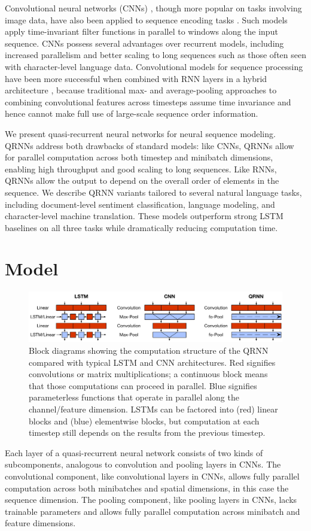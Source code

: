 \documentclass{article} %
\begin{document}
Convolutional neural networks (CNNs) \citep{Krizhevsky2012}, though more popular on tasks involving image data, have also been applied to sequence encoding tasks \citep{Zhang2015}. Such models apply time-invariant filter functions in parallel to windows along the input sequence.
CNNs possess several advantages over recurrent models, including increased parallelism and better scaling to long sequences such as those often seen with character-level language data.
Convolutional models for sequence processing have been more successful when combined with RNN layers in a hybrid architecture \citep{Lee2016}, because traditional max- and average-pooling approaches to combining convolutional features across timesteps assume time invariance and hence cannot make full use of large-scale sequence order information.

We present quasi-recurrent neural networks for neural sequence modeling. QRNNs address both  drawbacks of standard models: like CNNs, QRNNs allow for parallel computation across both timestep and minibatch dimensions, enabling high throughput and good scaling to long sequences. Like RNNs, QRNNs allow the output to depend on the overall order of elements in the sequence.
We describe QRNN variants tailored to several natural language tasks, including document-level sentiment classification, language modeling, and character-level machine translation. These models outperform strong LSTM baselines on all three tasks while dramatically reducing computation time.

\section{Model}
\begin{figure}[t!]
\centering
\includegraphics[width=.99\linewidth]{qrnn_arch.pdf}
\caption{
Block diagrams showing the computation structure of the QRNN compared with typical LSTM and CNN architectures. Red signifies convolutions or matrix multiplications; a continuous block means that those computations can proceed in parallel. Blue signifies parameterless functions that operate in parallel along the channel/feature dimension. LSTMs can be factored into (red) linear blocks and (blue) elementwise blocks, but computation at each timestep still depends on the results from the previous timestep.
}
\label{fig:QRNNmodel}
\end{figure}
Each layer of a quasi-recurrent neural network consists of two kinds of subcomponents, analogous to convolution and pooling layers in CNNs. The convolutional component, like convolutional layers in CNNs, allows fully parallel computation across both minibatches and spatial dimensions, in this case the sequence dimension.
The pooling component, like pooling layers in CNNs, lacks trainable parameters and allows fully parallel computation across minibatch and feature dimensions.
\end{document}
